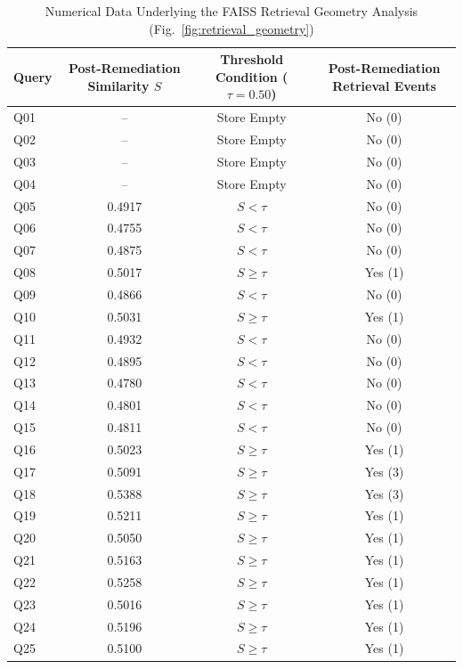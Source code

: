 \begin{table}[t]
\centering
\caption{Numerical Data Underlying the FAISS Retrieval Geometry Analysis (Fig.~\ref{fig:retrieval_geometry})}
\label{tab:fig3_validation}
\footnotesize
\setlength{\tabcolsep}{0pt}
\renewcommand{\arraystretch}{1.03}
\begin{tabular*}{\textwidth}{@{\extracolsep{\fill}}l c c c@{}}
\toprule
\textbf{Query} & \textbf{Post-Remediation Similarity $S$} & \textbf{Threshold Condition ($\tau = 0.50$)} & \textbf{Post-Remediation Retrieval Events} \\
\midrule
Q01 & -- & Store Empty & No (0) \\
Q02 & -- & Store Empty & No (0) \\
Q03 & -- & Store Empty & No (0) \\
Q04 & -- & Store Empty & No (0) \\
Q05 & 0.4917 & $S < \tau$ & No (0) \\
Q06 & 0.4755 & $S < \tau$ & No (0) \\
Q07 & 0.4875 & $S < \tau$ & No (0) \\
Q08 & 0.5017 & $S \ge \tau$ & Yes (1) \\
Q09 & 0.4866 & $S < \tau$ & No (0) \\
Q10 & 0.5031 & $S \ge \tau$ & Yes (1) \\
Q11 & 0.4932 & $S < \tau$ & No (0) \\
Q12 & 0.4895 & $S < \tau$ & No (0) \\
Q13 & 0.4780 & $S < \tau$ & No (0) \\
Q14 & 0.4801 & $S < \tau$ & No (0) \\
Q15 & 0.4811 & $S < \tau$ & No (0) \\
Q16 & 0.5023 & $S \ge \tau$ & Yes (1) \\
Q17 & 0.5091 & $S \ge \tau$ & Yes (3) \\
Q18 & 0.5388 & $S \ge \tau$ & Yes (3) \\
Q19 & 0.5211 & $S \ge \tau$ & Yes (1) \\
Q20 & 0.5050 & $S \ge \tau$ & Yes (1) \\
Q21 & 0.5163 & $S \ge \tau$ & Yes (1) \\
Q22 & 0.5258 & $S \ge \tau$ & Yes (1) \\
Q23 & 0.5016 & $S \ge \tau$ & Yes (1) \\
Q24 & 0.5196 & $S \ge \tau$ & Yes (1) \\
Q25 & 0.5100 & $S \ge \tau$ & Yes (1) \\
\bottomrule
\end{tabular*}

\end{table}
